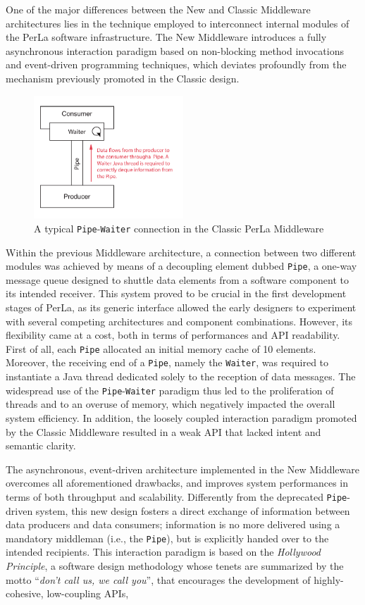 One of the major differences between the New and Classic Middleware
architectures lies in the technique employed to interconnect internal modules
of the PerLa software infrastructure. The New Middleware introduces a fully
asynchronous interaction paradigm based on non-blocking method invocations and
event-driven programming techniques, which deviates profoundly from the
mechanism previously promoted in the Classic design.

\begin{figure}[h!]
    \center
    \includegraphics[width=0.5\textwidth]{imgs/pipe_waiter.pdf}
    \caption{A typical \texttt{Pipe}-\texttt{Waiter} connection in the Classic
        PerLa Middleware}
\end{figure}

Within the previous Middleware architecture, a connection between two different
modules was achieved by means of a decoupling element dubbed \texttt{Pipe}, a
one-way message queue designed to shuttle data elements from a software
component to its intended receiver. This system proved to be crucial in the
first development stages of PerLa, as its generic interface allowed the early
designers to experiment with several competing architectures and component
combinations. However, its flexibility came at a cost, both in terms of
performances and API readability. First of all, each \texttt{Pipe} allocated an
initial memory cache of 10 elements. Moreover, the receiving end of a
\texttt{Pipe}, namely the \texttt{Waiter}, was required to instantiate a Java
thread dedicated solely to the reception of data messages. The widespread use
of the \texttt{Pipe}-\texttt{Waiter} paradigm thus led to the proliferation of
threads and to an overuse of memory, which negatively impacted the overall
system efficiency. In addition, the loosely coupled interaction paradigm
promoted by the Classic Middleware resulted in a weak API that lacked intent
and semantic clarity.

The asynchronous, event-driven architecture implemented in the New Middleware
overcomes all aforementioned drawbacks, and improves system performances in
terms of both throughput and scalability. Differently from the deprecated
\texttt{Pipe}-driven system, this new design fosters a direct exchange of
information between data producers and data consumers; information is no more
delivered using a mandatory middleman (i.e., the \texttt{Pipe}), but is
explicitly handed over to the intended recipients. This interaction paradigm is
based on the \textit{Hollywood Principle}, a software design methodology whose
tenets are summarized by the motto ``\textit{don't call us, we call you}'',
that encourages the development of highly-cohesive, low-coupling APIs, 

